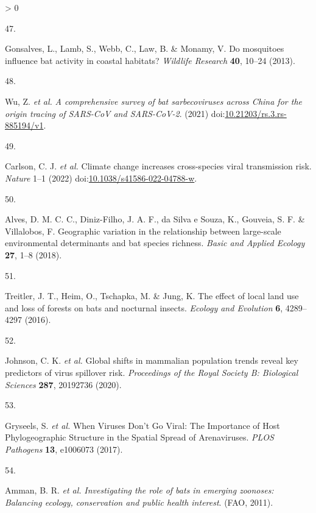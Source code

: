 \documentclass[11pt]{article}
\newlength{\cslhangindent}
\newlength{\csllabelwidth}
\newenvironment{CSLReferences}[3] %
 {%
  \setlength{\parindent}{0pt}
  \ifodd #1 \everypar{\setlength{\hangindent}{\cslhangindent}}\ignorespaces\fi
  \ifnum #2 > 0
  \setlength{\parskip}{#2\baselineskip}
  \fi
 }%
 {}
\newcommand{\CSLLeftMargin}[1]{\parbox[t]{\maxof{\widthof{#1}}{\csllabelwidth}}{#1}}
\newcommand{\CSLRightInline}[1]{\parbox[t]{\linewidth}{#1}}
\begin{document}
\begin{CSLReferences}{0}{0}
\leavevmode\hypertarget{ref-Gonsalves2013MosInf}{}%
\CSLLeftMargin{47. }
\CSLRightInline{Gonsalves, L., Lamb, S., Webb, C., Law, B. \& Monamy, V.
Do mosquitoes influence bat activity in coastal habitats? \emph{Wildlife
Research} \textbf{40}, 10--24 (2013).}

\leavevmode\hypertarget{ref-Wu2021ComSur}{}%
\CSLLeftMargin{48. }
\CSLRightInline{Wu, Z. \emph{et al.} \emph{A comprehensive survey of bat
sarbecoviruses across China for the origin tracing of SARS-CoV and
SARS-CoV-2}. (2021)
doi:\href{https://doi.org/10.21203/rs.3.rs-885194/v1}{10.21203/rs.3.rs-885194/v1}.}

\leavevmode\hypertarget{ref-Carlson2022CliCha}{}%
\CSLLeftMargin{49. }
\CSLRightInline{Carlson, C. J. \emph{et al.} Climate change increases
cross-species viral transmission risk. \emph{Nature} 1--1 (2022)
doi:\href{https://doi.org/10.1038/s41586-022-04788-w}{10.1038/s41586-022-04788-w}.}

\leavevmode\hypertarget{ref-Alves2018GeoVar}{}%
\CSLLeftMargin{50. }
\CSLRightInline{Alves, D. M. C. C., Diniz-Filho, J. A. F., da Silva e
Souza, K., Gouveia, S. F. \& Villalobos, F. Geographic variation in the
relationship between large-scale environmental determinants and bat
species richness. \emph{Basic and Applied Ecology} \textbf{27}, 1--8
(2018).}

\leavevmode\hypertarget{ref-Treitler2016EffLoc}{}%
\CSLLeftMargin{51. }
\CSLRightInline{Treitler, J. T., Heim, O., Tschapka, M. \& Jung, K. The
effect of local land use and loss of forests on bats and nocturnal
insects. \emph{Ecology and Evolution} \textbf{6}, 4289--4297 (2016).}

\leavevmode\hypertarget{ref-Johnson2020GloShi}{}%
\CSLLeftMargin{52. }
\CSLRightInline{Johnson, C. K. \emph{et al.} Global shifts in mammalian
population trends reveal key predictors of virus spillover risk.
\emph{Proceedings of the Royal Society B: Biological Sciences}
\textbf{287}, 20192736 (2020).}

\leavevmode\hypertarget{ref-Gryseels2017WheVir}{}%
\CSLLeftMargin{53. }
\CSLRightInline{Gryseels, S. \emph{et al.} When Viruses Don't Go Viral:
The Importance of Host Phylogeographic Structure in the Spatial Spread
of Arenaviruses. \emph{PLOS Pathogens} \textbf{13}, e1006073 (2017).}

\leavevmode\hypertarget{ref-Amman2011InvRol}{}%
\CSLLeftMargin{54. }
\CSLRightInline{Amman, B. R. \emph{et al.} \emph{Investigating the role
of bats in emerging zoonoses: Balancing ecology, conservation and public
health interest}. (FAO, 2011).}


\end{CSLReferences}
\end{document}
